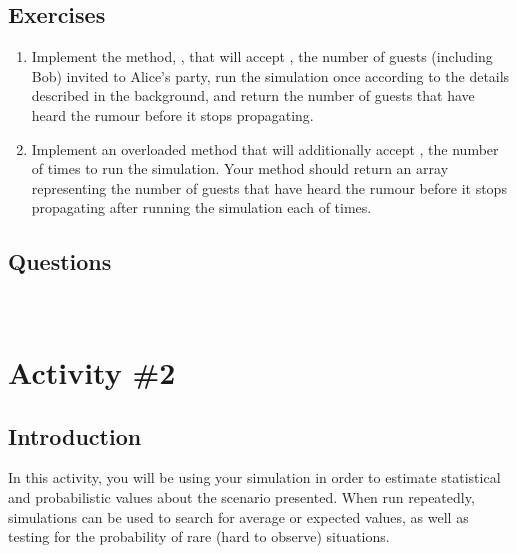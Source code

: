 		\subsection{Exercises}
			\begin{enumerate}
				\item Implement the method, , that will accept , the number of guests (including Bob) invited to Alice's party, run the simulation once according to the details described in the background, and return the number of guests that have heard the rumour before it stops propagating.
				\item Implement an overloaded  method that will additionally accept , the number of times to run the simulation. Your method should return an array representing the number of guests that have heard the rumour before it stops propagating after running the simulation each of  times.
			\end{enumerate}

		\subsection{Questions}
			\ \\[9pt]

	\pagebreak

	\section{Activity \#2}
		\subsection{Introduction}
			In this activity, you will be using your simulation in order to estimate statistical and probabilistic values about the scenario presented. When run repeatedly, simulations can be used to search for average or expected values, as well as testing for the probability of rare (hard to observe) situations.

